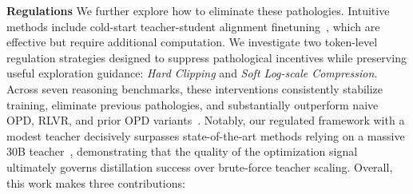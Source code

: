 \documentclass[11pt]{article}
\begin{document}
\vspace{0.1mm}
\noindent \textbf{Regulations}\quad 
We further explore how to eliminate these pathologies.
Intuitive methods include cold-start teacher-student alignment finetuning~\cite{opd-var-1,li2026rethinkingonpolicydistillationlarge}, which are effective but require additional computation.
We investigate two token-level regulation strategies designed to suppress pathological incentives while preserving useful exploration guidance: \emph{Hard Clipping} and \emph{Soft Log-scale Compression}.
Across seven reasoning benchmarks, these interventions consistently stabilize training, eliminate previous pathologies, and substantially outperform naive OPD, RLVR, and prior OPD variants~\cite{eopd}. 
Notably, our regulated framework with a modest teacher decisively surpasses state-of-the-art methods relying on a massive 30B teacher~\cite{gopd,hou2026uni}, demonstrating that the quality of the optimization signal ultimately governs distillation success over brute-force teacher scaling.
Overall, this work makes three contributions:


\end{document}
